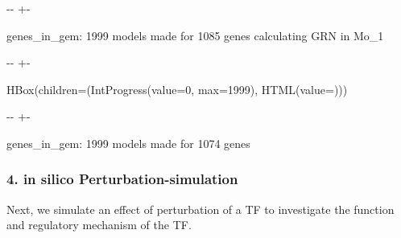\documentclass[letterpaper,10pt,english]{sphinxmanual}
\newlength\nbsphinxcodecellspacing
\begin{document}
%
{
\kern-\sphinxverbatimsmallskipamount\kern-\baselineskip
\kern+\FrameHeightAdjust\kern-\fboxrule
\vspace{\nbsphinxcodecellspacing}
%
\begin{sphinxVerbatim}[commandchars=\\\{\}]

genes\_in\_gem: 1999
models made for 1085 genes
calculating GRN in Mo\_1
\end{sphinxVerbatim}
}
\relax

{

\kern-\sphinxverbatimsmallskipamount\kern-\baselineskip
\kern+\FrameHeightAdjust\kern-\fboxrule
\vspace{\nbsphinxcodecellspacing}

%
\begin{sphinxVerbatim}[commandchars=\\\{\}]
HBox(children=(IntProgress(value=0, max=1999), HTML(value=\PYGZsq{}\PYGZsq{})))
\end{sphinxVerbatim}
}



%
{
\kern-\sphinxverbatimsmallskipamount\kern-\baselineskip
\kern+\FrameHeightAdjust\kern-\fboxrule
\vspace{\nbsphinxcodecellspacing}
%
\begin{sphinxVerbatim}[commandchars=\\\{\}]

genes\_in\_gem: 1999
models made for 1074 genes
\end{sphinxVerbatim}
}
\relax


\subsubsection{4. in silico Perturbation-simulation}
\label{\detokenize{notebooks/05_simulation/Gata1_KO_simulation_with_with_Paul_etal_2015_data:4.-in-silico-Perturbation-simulation}}
Next, we simulate an effect of perturbation of a TF to investigate the function and regulatory mechanism of the TF.
\end{document}
